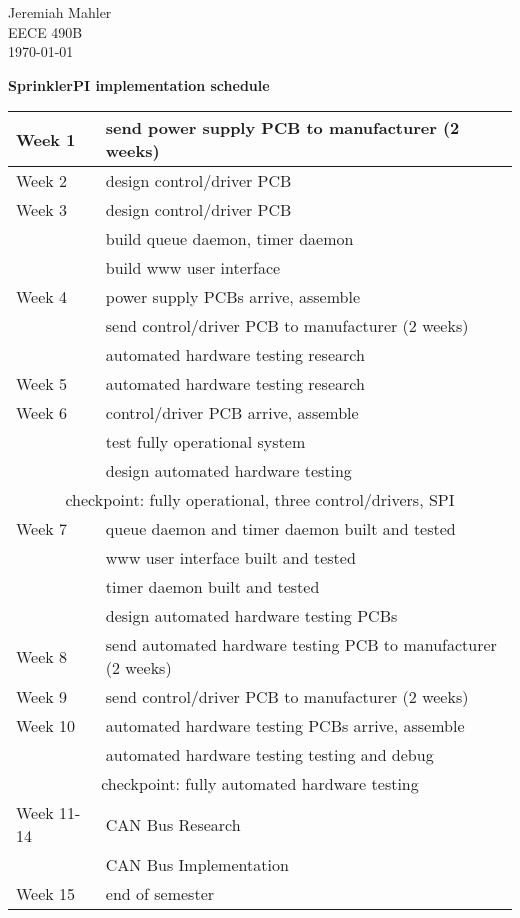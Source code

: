 \documentclass{article}
\begin{document}
Jeremiah Mahler \\
EECE 490B \\
\today

\vspace{0.25in}

\begin{center}
\textbf{SprinklerPI implementation schedule}
{\renewcommand{\arraystretch}{1.6}%
\begin{tabular}{|l|l|}
\hline
Week 1 & send power supply PCB to manufacturer (2 weeks) \\
\hline
Week 2 	& design control/driver PCB \\
\hline
Week 3 	& design control/driver PCB \\
		& build queue daemon, timer daemon \\
		& build www user interface \\
\hline
Week 4	& power supply PCBs arrive, assemble \\
		& send control/driver PCB to manufacturer (2 weeks) \\
		& automated hardware testing research \\
\hline
Week 5	& automated hardware testing research \\
\hline
Week 6  & control/driver PCB arrive, assemble \\
		& test fully operational system \\
		& design automated hardware testing \\
\hline
\multicolumn{2}{|c|}{checkpoint: fully operational, three control/drivers, SPI} \\
\hline
Week 7 	& queue daemon and timer daemon built and tested \\
		& www user interface built and tested \\
		& timer daemon built and tested \\
		& design automated hardware testing PCBs \\
\hline
Week 8 	& send automated hardware testing PCB to manufacturer (2 weeks) \\
\hline
Week 9  & send control/driver PCB to manufacturer (2 weeks) \\
\hline
Week 10  & automated hardware testing PCBs arrive, assemble \\
		 & automated hardware testing testing and debug \\
\hline
\multicolumn{2}{|c|}{checkpoint: fully automated hardware testing} \\
\hline
Week 11-14 & CAN Bus Research \\
			& CAN Bus Implementation \\
\hline
Week 15 & end of semester \\
\hline
\end{tabular}
}
\end{center}
\end{document}
